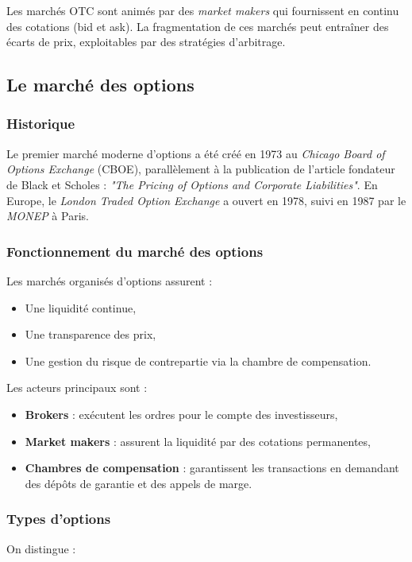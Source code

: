 Les marchés OTC sont animés par des \textit{market makers} qui fournissent en continu des cotations (bid et ask). La fragmentation de ces marchés peut entraîner des écarts de prix, exploitables par des stratégies d'arbitrage.

\subsection{Le marché des options}

\subsubsection{Historique}
Le premier marché moderne d'options a été créé en 1973 au \textit{Chicago Board of Options Exchange} (CBOE), parallèlement à la publication de l'article fondateur de Black et Scholes : \textit{"The Pricing of Options and Corporate Liabilities"}. En Europe, le \textit{London Traded Option Exchange} a ouvert en 1978, suivi en 1987 par le \textit{MONEP} à Paris.

\subsubsection{Fonctionnement du marché des options}
Les marchés organisés d'options assurent :

\begin{itemize}
	\item Une liquidité continue,
	\item Une transparence des prix,
	\item Une gestion du risque de contrepartie via la chambre de compensation.
\end{itemize}

Les acteurs principaux sont :

\begin{itemize}
	\item \textbf{Brokers} : exécutent les ordres pour le compte des investisseurs,
	\item \textbf{Market makers} : assurent la liquidité par des cotations permanentes,
	\item \textbf{Chambres de compensation} : garantissent les transactions en demandant des dépôts de garantie et des appels de marge.
\end{itemize}

\subsubsection{Types d'options}
On distingue :

